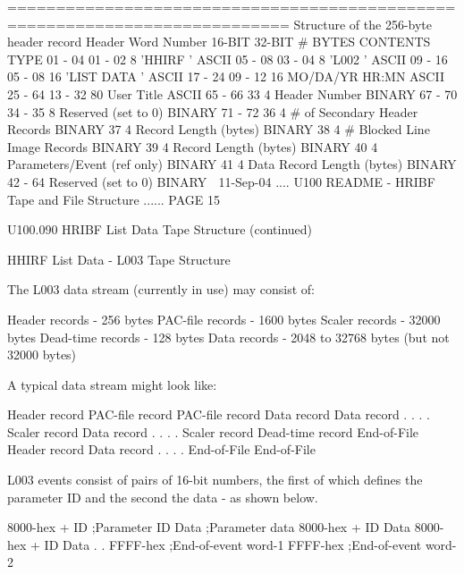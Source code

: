    ===========================================================================
   Structure of the 256-byte header record
   Header Word Number
      16-BIT   32-BIT   # BYTES  CONTENTS                        TYPE
     01 - 04  01 - 02         8  'HHIRF   '                      ASCII
     05 - 08  03 - 04         8  'L002    '                      ASCII
     09 - 16  05 - 08        16  'LIST DATA       '              ASCII
     17 - 24  09 - 12        16  MO/DA/YR HR:MN                  ASCII
     25 - 64  13 - 32        80  User Title                      ASCII
     65 - 66       33         4  Header Number                   BINARY
     67 - 70  34 - 35         8  Reserved (set to 0)             BINARY
     71 - 72       36         4  # of Secondary Header Records   BINARY
                   37         4  Record Length (bytes)           BINARY
                   38         4  # Blocked Line Image Records    BINARY
                   39         4  Record Length (bytes)           BINARY
                   40         4  Parameters/Event (ref only)     BINARY
                   41         4  Data Record Length (bytes)      BINARY
              42 - 64            Reserved (set to 0)             BINARY
    
   11-Sep-04 .... U100  README - HRIBF Tape and File Structure ...... PAGE  15
 
 
   U100.090  HRIBF List Data Tape Structure (continued)
 
   HHIRF List Data - L003 Tape Structure
 
   The L003 data stream (currently in use) may consist of:
 
   Header    records - 256   bytes
   PAC-file  records - 1600  bytes
   Scaler    records - 32000 bytes
   Dead-time records - 128   bytes
   Data      records - 2048 to 32768 bytes (but not 32000 bytes)
 
   A typical data stream might look like:
 
   Header    record
   PAC-file  record
   PAC-file  record
   Data      record
   Data      record
    .          .
    .          .
   Scaler    record
   Data      record
    .          .
    .          .
   Scaler    record
   Dead-time record
   End-of-File
   Header    record
   Data      record
    .          .
    .          .
   End-of-File
   End-of-File
 
 
   L003 events consist of pairs of 16-bit numbers, the first of which  defines
   the parameter ID and the second the data - as shown below.
 
   8000-hex + ID     ;Parameter ID
   Data              ;Parameter data
   8000-hex + ID
   Data
   8000-hex + ID
   Data
     .
     .
   FFFF-hex          ;End-of-event word-1
   FFFF-hex          ;End-of-event word-2
 
